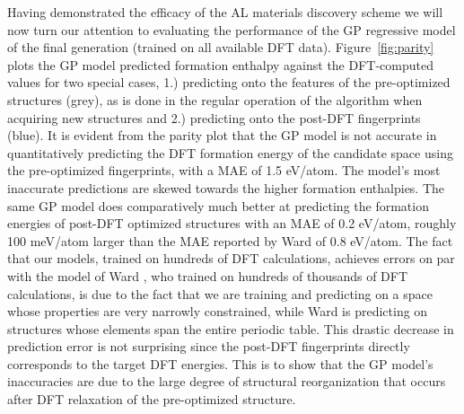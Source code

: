 


Having demonstrated the efficacy of the AL materials discovery scheme we will now turn our attention to evaluating the performance of the GP regressive model of the final generation (trained on all available \IrOthree DFT data).
%
Figure~\ref{fig:parity} plots the GP model predicted formation enthalpy against the DFT-computed values for two special cases,
1.) predicting onto the features of the pre-optimized structures (grey), as is done in the regular operation of the algorithm when acquiring new structures and
2.) predicting onto the post-DFT fingerprints (blue).
%
It is evident from the parity plot that the GP model is not accurate in quantitatively predicting the DFT formation energy of the candidate space using the pre-optimized fingerprints,
with a MAE of \mytilde\num{1.5} eV/atom.
%
The model's most inaccurate predictions are skewed towards the higher formation enthalpies.
%
The same GP model does comparatively much better at predicting the formation energies of post-DFT optimized structures with an MAE of \mytilde\num{0.2} eV/atom,
roughly 100 meV/atom larger than the MAE reported by Ward  of 0.8 eV/atom.
%
The fact that our models, trained on hundreds of DFT calculations,  achieves errors on par with the model of Ward , who trained on hundreds of thousands of DFT calculations, is due to the fact that we are training and predicting on a space whose properties are very narrowly constrained, while Ward  is predicting on structures whose elements span the entire periodic table.
%
This drastic decrease in prediction error is not surprising since the post-DFT fingerprints directly corresponds to the target DFT energies.
%
This is to show that the GP model's inaccuracies are due to the large degree of structural reorganization that occurs after DFT relaxation of the pre-optimized structure.
